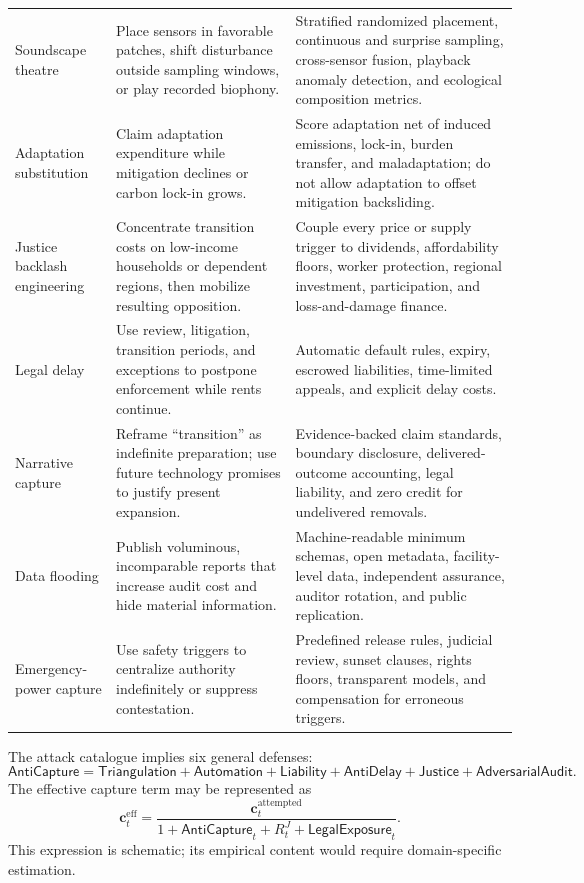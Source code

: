\documentclass[11pt,a4paper]{article}
\numberwithin{equation}{section}
\theoremstyle{definition}
\theoremstyle{plain}
\theoremstyle{remark}
\newcommand{\capture}{\bm{c}}
\begin{document}
\begin{longtable}{@{}L{0.17\textwidth}L{0.34\textwidth}L{0.41\textwidth}@{}}
\addlinespace
Soundscape theatre & Place sensors in favorable patches, shift disturbance outside sampling windows, or play recorded biophony. & Stratified randomized placement, continuous and surprise sampling, cross-sensor fusion, playback anomaly detection, and ecological composition metrics. \\
\addlinespace
Adaptation substitution & Claim adaptation expenditure while mitigation declines or carbon lock-in grows. & Score adaptation net of induced emissions, lock-in, burden transfer, and maladaptation; do not allow adaptation to offset mitigation backsliding. \\
\addlinespace
Justice backlash engineering & Concentrate transition costs on low-income households or dependent regions, then mobilize resulting opposition. & Couple every price or supply trigger to dividends, affordability floors, worker protection, regional investment, participation, and loss-and-damage finance. \\
\addlinespace
Legal delay & Use review, litigation, transition periods, and exceptions to postpone enforcement while rents continue. & Automatic default rules, expiry, escrowed liabilities, time-limited appeals, and explicit delay costs. \\
\addlinespace
Narrative capture & Reframe ``transition'' as indefinite preparation; use future technology promises to justify present expansion. & Evidence-backed claim standards, boundary disclosure, delivered-outcome accounting, legal liability, and zero credit for undelivered removals. \\
\addlinespace
Data flooding & Publish voluminous, incomparable reports that increase audit cost and hide material information. & Machine-readable minimum schemas, open metadata, facility-level data, independent assurance, auditor rotation, and public replication. \\
\addlinespace
Emergency-power capture & Use safety triggers to centralize authority indefinitely or suppress contestation. & Predefined release rules, judicial review, sunset clauses, rights floors, transparent models, and compensation for erroneous triggers. \\
\bottomrule
\end{longtable}

The attack catalogue implies six general defenses:
\begin{equation}
\mathsf{AntiCapture}=
\mathsf{Triangulation}+\mathsf{Automation}+\mathsf{Liability}
+\mathsf{AntiDelay}+\mathsf{Justice}+\mathsf{AdversarialAudit}.
\label{eq:anticapture}
\end{equation}
The effective capture term may be represented as
\begin{equation}
\capture_t^{\mathrm{eff}}=
\frac{\capture_t^{\mathrm{attempted}}}
{1+\mathsf{AntiCapture}_t+R_t^J+\mathsf{LegalExposure}_t}.
\label{eq:effectivecapture}
\end{equation}
This expression is schematic; its empirical content would require domain-specific estimation.
\end{document}
